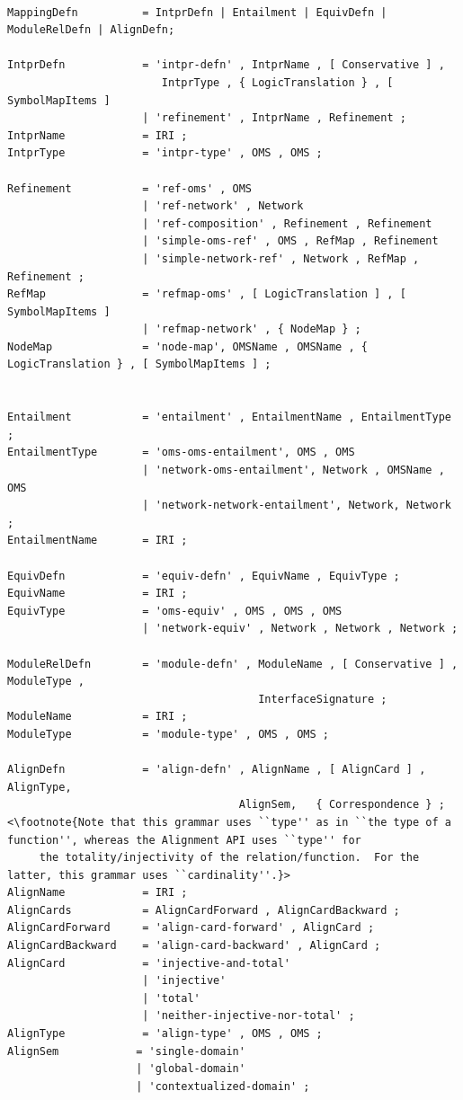 \documentclass[10pt,fleqn,%
\ifpretendfinal
final%
\else
draft%
\fi,
]{scrreprt}
\begin{document}
\begin{lstlisting}[language=ebnf,escapeinside={<>},mathescape]  % abstract syntax

MappingDefn          = IntprDefn | Entailment | EquivDefn | ModuleRelDefn | AlignDefn;

IntprDefn            = 'intpr-defn' , IntprName , [ Conservative ] , 
                        IntprType , { LogicTranslation } , [ SymbolMapItems ]                     
                     | 'refinement' , IntprName , Refinement ;
IntprName            = IRI ;
IntprType            = 'intpr-type' , OMS , OMS ;

Refinement           = 'ref-oms' , OMS 
                     | 'ref-network' , Network
                     | 'ref-composition' , Refinement , Refinement
                     | 'simple-oms-ref' , OMS , RefMap , Refinement 
                     | 'simple-network-ref' , Network , RefMap , Refinement ;
RefMap               = 'refmap-oms' , [ LogicTranslation ] , [ SymbolMapItems ] 
                     | 'refmap-network' , { NodeMap } ;
NodeMap              = 'node-map', OMSName , OMSName , { LogicTranslation } , [ SymbolMapItems ] ;


Entailment           = 'entailment' , EntailmentName , EntailmentType ;
EntailmentType       = 'oms-oms-entailment', OMS , OMS 
                     | 'network-oms-entailment', Network , OMSName , OMS 
                     | 'network-network-entailment', Network, Network ;
EntailmentName       = IRI ;

EquivDefn            = 'equiv-defn' , EquivName , EquivType ;
EquivName            = IRI ;
EquivType            = 'oms-equiv' , OMS , OMS , OMS
                     | 'network-equiv' , Network , Network , Network ;

ModuleRelDefn        = 'module-defn' , ModuleName , [ Conservative ] , ModuleType ,
                                       InterfaceSignature ;
ModuleName           = IRI ;
ModuleType           = 'module-type' , OMS , OMS ;

AlignDefn            = 'align-defn' , AlignName , [ AlignCard ] , AlignType, 
                                    AlignSem,   { Correspondence } ; <\footnote{Note that this grammar uses ``type'' as in ``the type of a function'', whereas the Alignment API uses ``type'' for
	 the totality/injectivity of the relation/function.  For the latter, this grammar uses ``cardinality''.}>
AlignName            = IRI ;
AlignCards           = AlignCardForward , AlignCardBackward ; 
AlignCardForward     = 'align-card-forward' , AlignCard ;
AlignCardBackward    = 'align-card-backward' , AlignCard ;
AlignCard            = 'injective-and-total'
                     | 'injective'
                     | 'total'
                     | 'neither-injective-nor-total' ;
AlignType            = 'align-type' , OMS , OMS ;
AlignSem            = 'single-domain' 
                    | 'global-domain' 
                    | 'contextualized-domain' ; 


\end{lstlisting}
\end{document}
